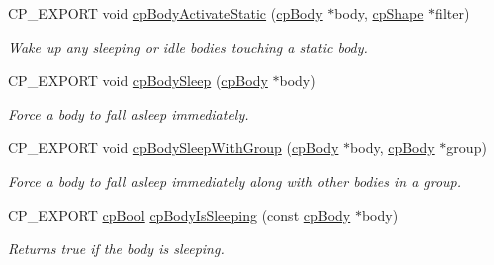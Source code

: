 \begin{DoxyCompactItemize}
\mbox{\label{group__cp_body_gabf84834a51b76230ecc83f90890559eb}} 
C\+P\+\_\+\+E\+X\+P\+O\+RT void \mbox{\hyperlink{group__cp_body_gabf84834a51b76230ecc83f90890559eb}{cp\+Body\+Activate\+Static}} (\mbox{\hyperlink{structcp_body}{cp\+Body}} $\ast$body, \mbox{\hyperlink{structcp_shape}{cp\+Shape}} $\ast$filter)
\begin{DoxyCompactList}\small\item\em Wake up any sleeping or idle bodies touching a static body. \end{DoxyCompactList}\item 
\mbox{\label{group__cp_body_gad19cfc0a8e8a96fedf723b165d32a108}} 
C\+P\+\_\+\+E\+X\+P\+O\+RT void \mbox{\hyperlink{group__cp_body_gad19cfc0a8e8a96fedf723b165d32a108}{cp\+Body\+Sleep}} (\mbox{\hyperlink{structcp_body}{cp\+Body}} $\ast$body)
\begin{DoxyCompactList}\small\item\em Force a body to fall asleep immediately. \end{DoxyCompactList}\item 
\mbox{\label{group__cp_body_gaae5b2ea3123f996b4db92e63e5f55513}} 
C\+P\+\_\+\+E\+X\+P\+O\+RT void \mbox{\hyperlink{group__cp_body_gaae5b2ea3123f996b4db92e63e5f55513}{cp\+Body\+Sleep\+With\+Group}} (\mbox{\hyperlink{structcp_body}{cp\+Body}} $\ast$body, \mbox{\hyperlink{structcp_body}{cp\+Body}} $\ast$group)
\begin{DoxyCompactList}\small\item\em Force a body to fall asleep immediately along with other bodies in a group. \end{DoxyCompactList}\item 
\mbox{\label{group__cp_body_ga1bbf47da33d1a2260866f2a257e1b4fa}} 
C\+P\+\_\+\+E\+X\+P\+O\+RT \mbox{\hyperlink{group__basic_types_gabc5e752c48f3449ca26ef413ecbd647e}{cp\+Bool}} \mbox{\hyperlink{group__cp_body_ga1bbf47da33d1a2260866f2a257e1b4fa}{cp\+Body\+Is\+Sleeping}} (const \mbox{\hyperlink{structcp_body}{cp\+Body}} $\ast$body)
\begin{DoxyCompactList}\small\item\em Returns true if the body is sleeping. \end{DoxyCompactList}\item 
\mbox{\label{group__cp_body_gab29fcc05a72380a8ae4cb09af6def230}} 

\end{DoxyCompactItemize}
